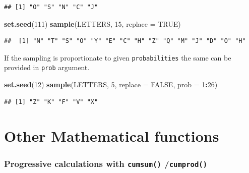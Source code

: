 \documentclass[
]{book}
\newenvironment{Shaded}{\begin{snugshade}}{\end{snugshade}}
\newcommand{\AttributeTok}[1]{\textcolor[rgb]{0.13,0.29,0.53}{#1}}
\newcommand{\ConstantTok}[1]{\textcolor[rgb]{0.56,0.35,0.01}{#1}}
\newcommand{\DecValTok}[1]{\textcolor[rgb]{0.00,0.00,0.81}{#1}}
\newcommand{\FunctionTok}[1]{\textcolor[rgb]{0.13,0.29,0.53}{\textbf{#1}}}
\newcommand{\NormalTok}[1]{#1}
\newcommand{\SpecialCharTok}[1]{\textcolor[rgb]{0.81,0.36,0.00}{\textbf{#1}}}
\begin{document}
\begin{verbatim}
## [1] "O" "S" "N" "C" "J"
\end{verbatim}

\begin{Shaded}
\begin{Highlighting}[]
\FunctionTok{set.seed}\NormalTok{(}\DecValTok{111}\NormalTok{)}
\FunctionTok{sample}\NormalTok{(LETTERS, }\DecValTok{15}\NormalTok{, }\AttributeTok{replace =} \ConstantTok{TRUE}\NormalTok{)}
\end{Highlighting}
\end{Shaded}

\begin{verbatim}
##  [1] "N" "T" "S" "O" "Y" "E" "C" "H" "Z" "Q" "M" "J" "D" "O" "H"
\end{verbatim}

If the sampling is proportionate to given \texttt{probabilities} the same can be provided in \texttt{prob} argument.

\begin{Shaded}
\begin{Highlighting}[]
\FunctionTok{set.seed}\NormalTok{(}\DecValTok{12}\NormalTok{)}
\FunctionTok{sample}\NormalTok{(LETTERS, }\DecValTok{5}\NormalTok{, }\AttributeTok{replace =} \ConstantTok{FALSE}\NormalTok{, }\AttributeTok{prob =} \DecValTok{1}\SpecialCharTok{:}\DecValTok{26}\NormalTok{)}
\end{Highlighting}
\end{Shaded}

\begin{verbatim}
## [1] "Z" "K" "F" "V" "X"
\end{verbatim}

\hypertarget{other-mathematical-functions}{%
\section{Other Mathematical functions}\label{other-mathematical-functions}}

\hypertarget{progressive-calculations-with-cumsum-cumprod}{%
\subsubsection*{\texorpdfstring{Progressive calculations with \texttt{cumsum()} /\texttt{cumprod()}}{Progressive calculations with cumsum() /cumprod()}}\label{progressive-calculations-with-cumsum-cumprod}}
\end{document}
